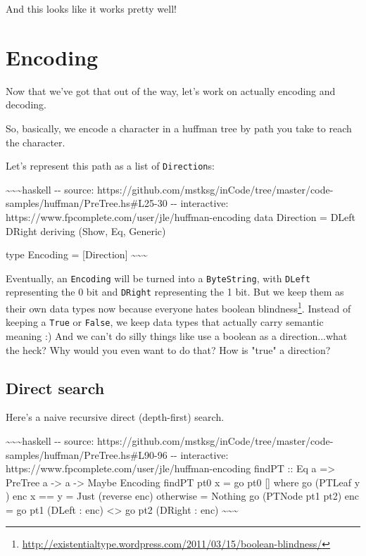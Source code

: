 \documentclass[]{article}
\renewcommand{\href}[2]{#2\footnote{\url{#1}}}
\begin{document}
And this looks like it works pretty well!

\section{Encoding}

Now that we've got that out of the way, let's work on actually encoding and
decoding.

So, basically, we encode a character in a huffman tree by path you take to reach
the character.

Let's represent this path as a list of \texttt{Direction}s:

\textasciitilde{}\textasciitilde{}\textasciitilde{}haskell -\/- source:
https://github.com/mstksg/inCode/tree/master/code-samples/huffman/PreTree.hs\#L25-30
-\/- interactive: https://www.fpcomplete.com/user/jle/huffman-encoding data
Direction = DLeft \textbar{} DRight deriving (Show, Eq, Generic)

type Encoding = {[}Direction{]}
\textasciitilde{}\textasciitilde{}\textasciitilde{}

Eventually, an \texttt{Encoding} will be turned into a \texttt{ByteString}, with
\texttt{DLeft} representing the 0 bit and \texttt{DRight} representing the 1
bit. But we keep them as their own data types now because everyone hates
\href{http://existentialtype.wordpress.com/2011/03/15/boolean-blindness/}{boolean
blindness}. Instead of keeping a \texttt{True} or \texttt{False}, we keep data
types that actually carry semantic meaning :) And we can't do silly things like
use a boolean as a direction...what the heck? Why would you even want to do
that? How is "true" a direction?

\subsection{Direct search}

Here's a naive recursive direct (depth-first) search.

\textasciitilde{}\textasciitilde{}\textasciitilde{}haskell -\/- source:
https://github.com/mstksg/inCode/tree/master/code-samples/huffman/PreTree.hs\#L90-96
-\/- interactive: https://www.fpcomplete.com/user/jle/huffman-encoding findPT ::
Eq a =\textgreater{} PreTree a -\textgreater{} a -\textgreater{} Maybe Encoding
findPT pt0 x = go pt0 {[}{]} where go (PTLeaf y ) enc \textbar{} x == y = Just
(reverse enc) \textbar{} otherwise = Nothing go (PTNode pt1 pt2) enc = go pt1
(DLeft : enc) \textless{}\textbar{}\textgreater{} go pt2 (DRight : enc)
\textasciitilde{}\textasciitilde{}\textasciitilde{}
\end{document}
